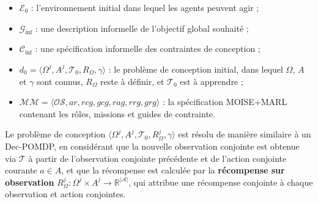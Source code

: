 \documentclass[pdflatex,sn-mathphys-num]{sn-jnl}%
\theoremstyle{thmstyleone}%
\theoremstyle{thmstyletwo}%
\theoremstyle{thmstylethree}%
\begin{document}
\begin{itemize}
    \item $\mathcal{E}_0$ : l'environnement initial dans lequel les agents peuvent agir ;
    \item $\mathcal{G}_{\text{inf}}$ : une description informelle de l'objectif global souhaité ;
    \item $\mathcal{C}_{\text{inf}}$ : une spécification informelle des contraintes de conception ;
    \item $d_0 = \langle \Omega^j, A^j, \mathcal{T}_0, R_{\Omega}, \gamma \rangle$ : le problème de conception initial, dans lequel $\Omega$, $A$ et $\gamma$ sont connus, $R_{\Omega}$ reste à définir, et $\mathcal{T}_0$ est à apprendre ;
    \item $\mathcal{MM} = \langle \mathcal{OS}, ar, rcg, gcg, rag, rrg, grg \rangle$ : la spécification MOISE+MARL contenant les rôles, missions et guides de contrainte.
\end{itemize}

Le problème de conception $\langle \Omega^j, A^j, \mathcal{T}_0, R_{\Omega}^j, \gamma \rangle$ est résolu de manière similaire à un Dec-POMDP, en considérant que la nouvelle observation conjointe est obtenue via $\mathcal{T}$ à partir de l'observation conjointe précédente et de l'action conjointe courante $a \in A$, et que la récompense est calculée par la \textbf{récompense sur observation} $R^j_{\Omega}: \Omega^j \times A^j \rightarrow \mathbb{R}^{|\mathcal{A}|}$, qui attribue une récompense conjointe à chaque observation et action conjointes.

\vspace{1em}
\end{document}

